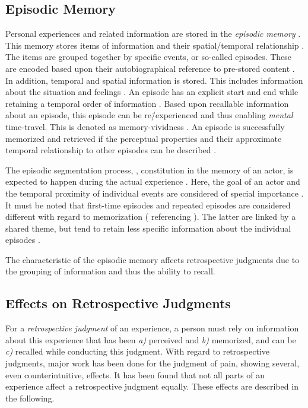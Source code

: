 \subsection{Episodic Memory}
Personal experiences and related information are stored in the \emph{episodic memory} \citep{tulving_episodic_1972}.
This memory stores items of information and their spatial\-/temporal relationship \citep[][p.\,385]{tulving_episodic_1972}.
The items are grouped together by specific events, or so-called episodes.
These are encoded based upon their autobiographical reference to pre-stored content \citep[][p.\,385f.]{tulving_episodic_1972}.
In addition, temporal and spatial information is stored.
This includes information about the situation and feelings \citep[][p.\,385f.]{tulving_episodic_1972}.
An episode has an explicit start and end while retaining a temporal order of information \citep[][p.\,262]{conway_construction_2000}.
Based upon recallable information about an episode, this episode can be re\=/experienced and thus enabling \emph{mental} time-travel.
This is denoted as memory-vividness \citep{conway_construction_2000}.
An episode is successfully memorized and retrieved if the perceptual properties and their approximate temporal relationship to other episodes can be described \citep{conway_construction_2000}.

The episodic segmentation process, \ie, constitution in the memory of an actor, is expected to happen during the actual experience \citep[][]{ezzyat_what_2011, kurby_segmentation_2008}.
Here, the goal of an actor and the temporal proximity of individual events are considered of special importance \citep[][]{black_episodes_1979}.
It must be noted that first-time episodes and repeated episodes are considered different with regard to memorization (\citet{conway_construction_2000} referencing \citet{barsalou_content_1988}).
The latter are linked by a shared theme, but tend to retain less specific information about the individual episodes \citep{robinson_first_1992}.

The characteristic of the episodic memory affects retrospective judgments due to the grouping of information and thus the ability to recall.

\subsection{Effects on Retrospective Judgments}\label{chap03:effects}
For a \emph{retrospective judgment} of an experience, a person must rely on information about this experience that has been \emph{a)} perceived and \emph{b)} memorized, and can be \emph{c)} recalled while conducting this judgment.
With regard to retrospective judgments, major work has been done for the judgment of pain, showing several, even counterintuitive, effects.
It has been found that not all parts of an experience affect a retrospective judgment equally.
These effects are described in the following.

